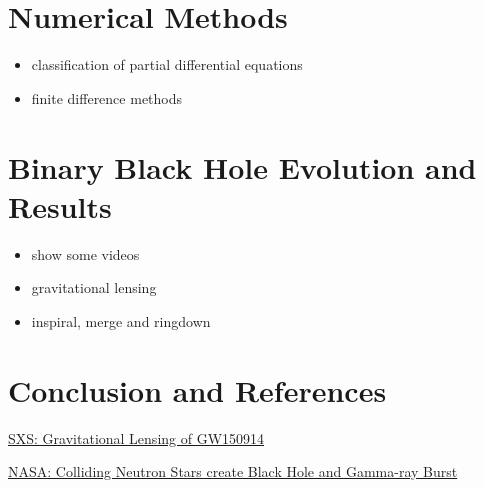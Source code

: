 \documentclass[twocolumn]{article}
\begin{document}
  \section{Numerical Methods} %
  \label{sec:numerical_methods}
    \begin{itemize}
      \item classification of partial differential equations
      \item finite difference methods
    \end{itemize}

  \section{Binary Black Hole Evolution and Results} %
  \label{sec:binary_black_hole_evolution_and_results}
    \begin{itemize}
      \item show some videos
      \item gravitational lensing
      \item inspiral, merge and ringdown
    \end{itemize}

  \section{Conclusion and References} %
  \label{sec:references}


  \href{run:videos/sxs-bbh-gravitational_lensing_of_gw150914.webm}{SXS: Gravitational Lensing of GW150914}

  \href{run:videos/nasa-colliding_neutron_stars_create_black_hole_and_gamma-ray_burst.webm}{NASA: Colliding Neutron Stars create Black Hole and Gamma-ray Burst}

  \nocite{*}
  
  

\end{document}
